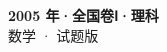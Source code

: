 \documentclass[zihao=-4, a4paper]{ctexart}
\begin{document}
\begin{center}
  {\Large\bfseries 2005 年·全国卷Ⅰ·理科}\\[4pt]
  {\large 数学 · 试题版}
\end{center}
\medskip
{}

\end{document}

